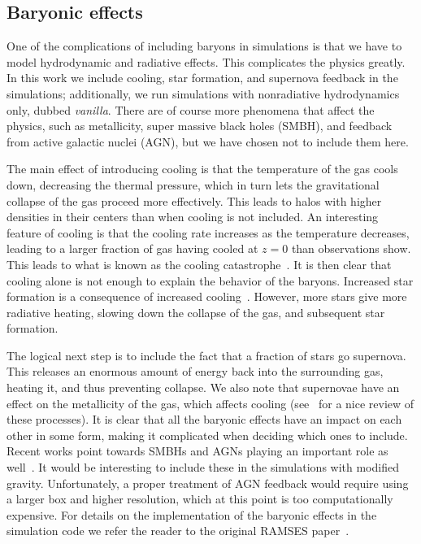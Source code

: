 \documentclass{aa}
\begin{document}
\subsection{Baryonic effects}
One of the complications of including baryons in simulations is  that we have to model hydrodynamic and radiative effects. This complicates the physics greatly. In this work we   include cooling, star formation, and supernova feedback in the simulations; additionally, we run simulations with nonradiative hydrodynamics only, dubbed \textit{vanilla}. There are of course more phenomena that affect the physics, such as metallicity, super massive black holes (SMBH), and feedback from active galactic nuclei (AGN), but we have chosen not to include them here. 

The main effect of introducing cooling is that the temperature of the gas cools down, decreasing the thermal pressure, which in turn lets the gravitational collapse of the gas proceed more effectively. This leads to halos with higher densities in their centers than when cooling is not included. An interesting feature of cooling is that the cooling rate increases as the temperature decreases, leading to a larger fraction of gas having cooled at $z=0$ than observations show. This leads to what is known as the cooling catastrophe~\citep{balogh2001revisiting}. It is then clear that cooling alone is not enough to explain the behavior of the baryons.
Increased star formation is a consequence of increased cooling~\citep{gerritsen1997star}. However, more stars give more radiative heating, slowing down the collapse of the gas, and subsequent star formation.

The logical next step is to include the fact that a fraction of stars go supernova. This releases an enormous amount of energy back into the surrounding gas, heating it, and thus preventing collapse. We also note  that supernovae have an effect on the metallicity of the gas, which affects cooling (see~\citealt{somerville2015physical} for a nice review of these processes). 
It is clear that all the baryonic effects have an impact on each other in some form, making it complicated when deciding which ones to include. 
Recent works point towards SMBHs and AGNs playing an important role as well~\citep{martizzi2012effects}.
It would be interesting to include these in the simulations with modified gravity. Unfortunately, a proper treatment of AGN feedback would require using a larger box and higher resolution, which at this point is too computationally expensive.
For details on the implementation of the baryonic effects in the simulation code we refer the reader to the original RAMSES paper~\citep{teyssier2002cosmological}. 
\end{document}
